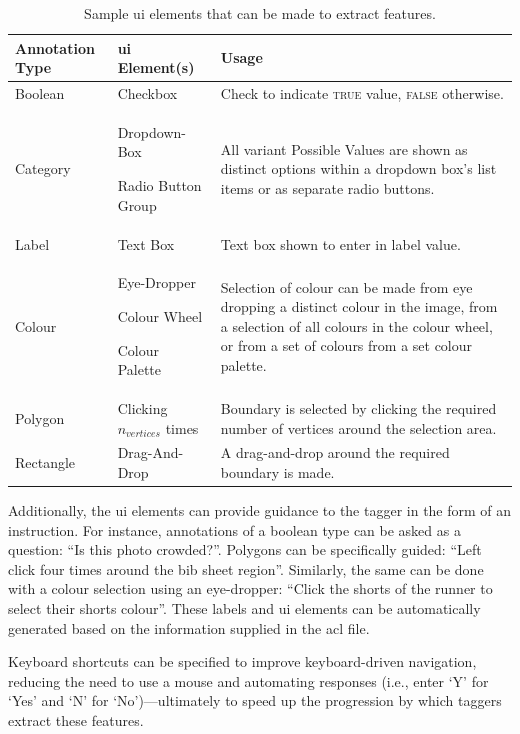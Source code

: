 \begin{table}
  \centering
  \caption[Sample UI elements to extract features in Argus]{Sample \gls{ui} elements that can be made to extract features.}
  \label{tab:dataset:process:ui_elements}
    \begin{tabular}{lp{}p{}}
    \toprule
      \bfseries Annotation Type &
      \bfseries \gls{ui} Element(s) &
      \bfseries Usage
    \\
    \midrule
      Boolean &
      Checkbox &
      Check to indicate \textsc{true} value, \textsc{false} otherwise.
    \\
      Category &
      { Dropdown-Box \par Radio Button Group } &
      All variant Possible Values are shown as distinct options within a dropdown box's list items or as separate radio buttons.
    \\
      Label &
      Text Box &
      Text box shown to enter in label value.
    \\
      Colour &
      { Eye-Dropper \par Colour Wheel \par Colour Palette } &
      Selection of colour can be made from eye dropping a distinct colour in the image, from a selection of all colours in the colour wheel, or from a set of colours from a set colour palette.
    \\
      Polygon &
      Clicking $n_{vertices}$ times &
      Boundary is selected by clicking the required number of vertices around the selection area.
    \\
      Rectangle &
      Drag-And-Drop &
      A drag-and-drop around the required boundary is made.
    \\
    \bottomrule
    \end{tabular}
\end{table}

Additionally, the \gls{ui} elements can provide guidance to the tagger in the form of an instruction. For instance, annotations of a boolean type can be asked as a question: ``Is this photo crowded?''. Polygons can be specifically guided: ``Left click four times around the bib sheet region''. Similarly, the same can be done with a colour selection using an eye-dropper: ``Click the shorts of the runner to select their shorts colour''. These labels and \gls{ui} elements can be automatically generated based on the information supplied in the \gls{acl} file.

Keyboard shortcuts can be specified to improve keyboard-driven navigation, reducing the need to use a mouse and automating responses (i.e., enter `Y' for `Yes' and `N' for `No')---ultimately to speed up the progression by which taggers extract these features.

